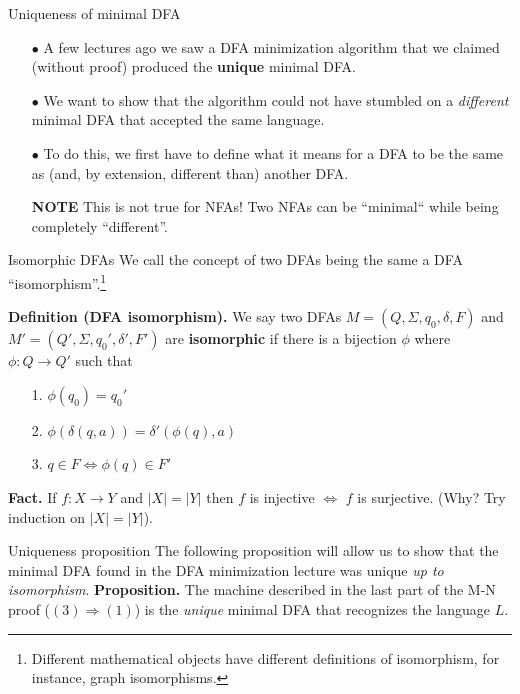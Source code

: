 \documentclass[10pt]{beamer}
\begin{document}
\begin{frame}{Uniqueness of minimal DFA}
    \begin{itemize}
        \item[$\bullet$] A few lectures ago we saw a DFA minimization algorithm that we claimed (without proof) produced the \textbf{unique} minimal DFA.
        \item[$\bullet$] We want to show that the algorithm could not have stumbled on a \textit{different} minimal DFA that accepted the same language.
        \item[$\bullet$] To do this, we first have to define what it means for a DFA to be the same as (and, by extension, different than) another DFA.
        \item[\textbf{NOTE}] This is not true for NFAs! Two NFAs can be ``minimal`` while being completely ``different''.
    \end{itemize}
\end{frame}

\begin{frame}{Isomorphic DFAs}
    We call the concept of two DFAs being the same a DFA ``isomorphism''.\footnote{Different mathematical objects have different definitions of isomorphism, for instance, graph isomorphisms.}

    \textbf{Definition (DFA isomorphism).}  We say two DFAs $M=(Q, \Sigma, q_0, \delta, F)$ and $M'=(Q', \Sigma, q_0', \delta', F')$ are \textbf{isomorphic} if there is a bijection $\phi$ where $\phi : Q \rightarrow Q'$ such that 
    \begin{itemize}
        \item[1.] $\phi(q_0) = q_0'$
        \item[2.] $\phi(\delta(q, a)) = \delta'(\phi(q), a)$
              \vspace{5em}
        \item[3.] $q \in F \iff \phi(q) \in F'$
    \end{itemize}

    \textbf{Fact.} If $f: X \rightarrow Y$ and $|X| = |Y|$ then $f$ is injective $\iff$ $f$ is surjective. (Why? Try induction on $|X| = |Y|$).

    \vspace{2em}

\end{frame}

\begin{frame}{Uniqueness proposition}
    The following proposition will allow us to show that the minimal DFA found in the DFA minimization lecture was unique \textit{up to isomorphism}.
    \textbf{Proposition.} The machine described in the last part of the M-N proof ($(3) \Rightarrow (1)$) is the \textit{unique} minimal DFA that recognizes the language $L$.
\end{frame}
\end{document}
